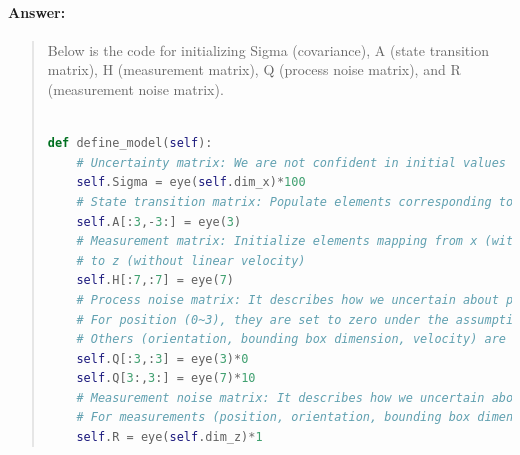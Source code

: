\documentclass[11pt]{article}
\begin{document}
\paragraph{Answer:} 
\begin{quote}

Below is the code for initializing Sigma (covariance), A (state transition matrix), H (measurement matrix), Q (process noise matrix), and R (measurement noise matrix).

\begin{lstlisting}[language=Python, basicstyle=\scriptsize]

def define_model(self):
    # Uncertainty matrix: We are not confident in initial values to every state element
    self.Sigma = eye(self.dim_x)*100
    # State transition matrix: Populate elements corresponding to linear velocity dynamics
    self.A[:3,-3:] = eye(3)
    # Measurement matrix: Initialize elements mapping from x (with linear velocity) 
    # to z (without linear velocity)
    self.H[:7,:7] = eye(7)
    # Process noise matrix: It describes how we uncertain about propagations to every state element.
    # For position (0~3), they are set to zero under the assumption that we 'trust' linear velocity.
    # Others (orientation, bounding box dimension, velocity) are set to 10
    self.Q[:3,:3] = eye(3)*0
    self.Q[3:,3:] = eye(7)*10
    # Measurement noise matrix: It describes how we uncertain about measurements.
    # For measurements (position, orientation, bounding box dimension), they are set to 1
    self.R = eye(self.dim_z)*1

\end{lstlisting}


\end{quote}
\end{document}
